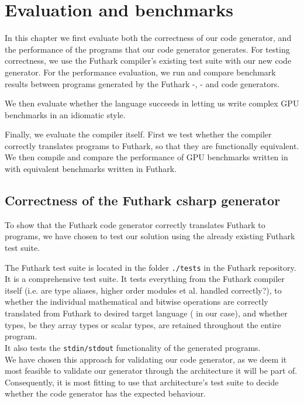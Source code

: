 \chapter{Evaluation and benchmarks}
In this chapter we first evaluate both the correctness of our code generator,
and the performance of the \csharp{} programs that our code generator generates.
For testing correctness, we use the Futhark compiler's existing test suite with
our new code generator. For the performance evaluation, we run and compare benchmark
results between programs generated by the Futhark \csharp{}-, \clang{}- and \Python{} code generators.

We then evaluate whether the \fshark{} language succeeds in letting us write
complex GPU benchmarks in an idiomatic \fsharp{} style.

Finally, we evaluate the \fshark{} compiler itself. First we test whether the
\fshark{} compiler correctly translates \fshark{} programs to Futhark, so that
they are functionally equivalent.
We then compile and compare the performance of GPU benchmarks written in
\fshark{} with equivalent benchmarks written in Futhark.


\section{Correctness of the Futhark csharp{} generator}
\label{subsec:futharkcsharpcorrectness}
To show that the Futhark \csharp{} code generator correctly translates Futhark
to \csharp{} programs, we have chosen to test our solution using the already existing Futhark test
suite.

The Futhark test suite is located in the folder \texttt{./tests} in the Futhark
repository. It is a comprehensive test suite.
It tests everything from the Futhark compiler itself (i.e. are type aliases,
higher order modules et al. handled correctly?),
to whether the individual mathematical and bitwise operations are correctly
translated from Futhark to desired target language (\csharp{} in our case), and
whether types, be they array types or scalar types, are retained throughout the
entire program.
\\
It also tests the \texttt{stdin/stdout} functionality of the generated programs.
\\
We have chosen this approach for validating our code generator, as we deem it
most feasible to validate our generator through the architecture it will be part
of. Consequently, it is most fitting to use that architecture's test suite to
decide whether the code generator has the expected behaviour. 


